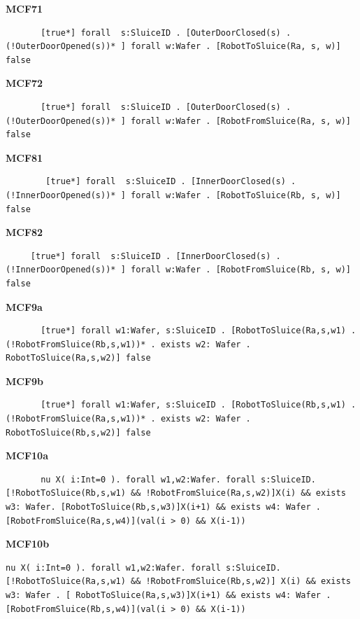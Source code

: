 \documentclass[12pt]{report}
\begin{document}
    \textbf{MCF71}
    \begin{lstlisting}
       [true*] forall  s:SluiceID . [OuterDoorClosed(s) . (!OuterDoorOpened(s))* ] forall w:Wafer . [RobotToSluice(Ra, s, w)] false
    \end{lstlisting}

    \textbf{MCF72}
    \begin{lstlisting}
       [true*] forall  s:SluiceID . [OuterDoorClosed(s) . (!OuterDoorOpened(s))* ] forall w:Wafer . [RobotFromSluice(Ra, s, w)] false
    \end{lstlisting}

    \textbf{MCF81}
    \begin{lstlisting}
        [true*] forall  s:SluiceID . [InnerDoorClosed(s) . (!InnerDoorOpened(s))* ] forall w:Wafer . [RobotToSluice(Rb, s, w)] false
    \end{lstlisting}

    \textbf{MCF82}
    \begin{lstlisting}
     [true*] forall  s:SluiceID . [InnerDoorClosed(s) . (!InnerDoorOpened(s))* ] forall w:Wafer . [RobotFromSluice(Rb, s, w)] false
    \end{lstlisting}

    \textbf{MCF9a}
    \begin{lstlisting}
       [true*] forall w1:Wafer, s:SluiceID . [RobotToSluice(Ra,s,w1) . (!RobotFromSluice(Rb,s,w1))* . exists w2: Wafer . RobotToSluice(Ra,s,w2)] false
    \end{lstlisting}

    \textbf{MCF9b}
    \begin{lstlisting}
       [true*] forall w1:Wafer, s:SluiceID . [RobotToSluice(Rb,s,w1) . (!RobotFromSluice(Ra,s,w1))* . exists w2: Wafer . RobotToSluice(Rb,s,w2)] false
    \end{lstlisting}

    \textbf{MCF10a}
    \begin{lstlisting}
       nu X( i:Int=0 ). forall w1,w2:Wafer. forall s:SluiceID. [!RobotToSluice(Rb,s,w1) && !RobotFromSluice(Ra,s,w2)]X(i) && exists w3: Wafer. [RobotToSluice(Rb,s,w3)]X(i+1) && exists w4: Wafer .[RobotFromSluice(Ra,s,w4)](val(i > 0) && X(i-1)) 
    \end{lstlisting}

    \textbf{MCF10b}
    \begin{lstlisting}
nu X( i:Int=0 ). forall w1,w2:Wafer. forall s:SluiceID. [!RobotToSluice(Ra,s,w1) && !RobotFromSluice(Rb,s,w2)] X(i) && exists w3: Wafer . [ RobotToSluice(Ra,s,w3)]X(i+1) && exists w4: Wafer .[RobotFromSluice(Rb,s,w4)](val(i > 0) && X(i-1))
    \end{lstlisting}
\end{document}
